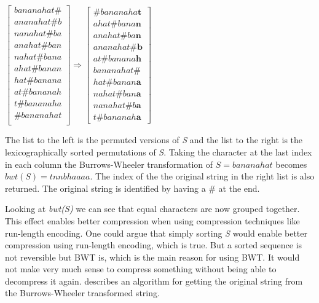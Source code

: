 \begin{center}
$\begin{bmatrix}
	bananahat\#\\
	ananahat\#b\\
	nanahat\#ba\\
	anahat\#ban\\
	nahat\#bana\\
	ahat\#banan\\
	hat\#banana\\
	at\#bananah\\
	t\#bananaha\\
	\#bananahat\\
\end{bmatrix} \Rightarrow
\begin{bmatrix}
	\#bananaha\textbf{t}\\
	ahat\#bana\textbf{n}\\
	anahat\#ba\textbf{n}\\
	ananahat\#\textbf{b}\\
	at\#banana\textbf{h}\\
	bananahat\#\\
	hat\#banan\textbf{a}\\
	nahat\#ban\textbf{a}\\
	nanahat\#b\textbf{a}\\
	t\#bananah\textbf{a}
\end{bmatrix}$
\end{center}

The list to the left is the permuted versions of \textit{S} and the list to the right is the lexicographically sorted permutations of \textit{S}.
Taking the character at the last index in each column the Burrows-Wheeler transformation of $S=bananahat$ becomes $bwt(S) = tnnbhaaaa$. The index of the the original string in the right list is also returned. 
The original string is identified by having a \# at the end.

Looking at \textit{bwt(S)} we can see that equal characters are now grouped together.
This effect enables better compression when using compression techniques like run-length encoding.
One could argue that simply sorting \textit{S} would enable better compression using run-length encoding, which is true. 
But a sorted sequence is not reversible but BWT is, which is the main reason for using BWT. 
It would not make very much sense to compress something without being able to decompress it again.
\citep[Section~2]{BWToriginalArticle} describes an algorithm for getting the original string from the Burrows-Wheeler transformed string.

